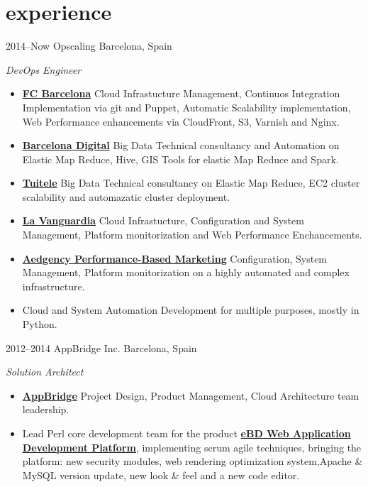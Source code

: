 \documentclass[]{friggeri-cv} %
\begin{document}
\section{experience}
\begin{entrylist}

\entry
{2014--Now}
{Opscaling}
{Barcelona, Spain}
{\emph{DevOps Engineer} \\
\begin{itemize}
\item \href{http://www.fcbarcelona.com/}{\textbf{FC Barcelona}} Cloud Infrastucture Management, Continuos Integration Implementation via git and Puppet, Automatic Scalability implementation, Web Performance enhancements via CloudFront, S3, Varnish and Nginx.
\item \href{http://www.bdigital.org/}{\textbf{Barcelona Digital}} Big Data Technical consultancy and Automation on Elastic Map Reduce, Hive, GIS Tools for elastic Map Reduce and Spark.
\item \href{http://www.tuitele.tv/}{\textbf{Tuitele}} Big Data Technical consultancy on Elastic Map Reduce, EC2 cluster scalability and automazatic cluster deployment.
\item \href{http://www.lavanguardia.com/}{\textbf{La Vanguardia}} Cloud Infrastucture, Configuration and System Management, Platform monitorization and Web Performance Enchancements.
\item \href{http://www.aedgency.com/}{\textbf{Aedgency Performance-Based Marketing}} Configuration, System Management, Platform monitorization on a highly automated and complex infrastructure.
\item Cloud and System Automation Development for multiple purposes, mostly in Python.   
\end{itemize}}
\pagebreak
\entry
{2012--2014}
{AppBridge Inc.}
{Barcelona, Spain}
{\emph{Solution Architect} \\
\begin{itemize}
\item \href{http://www.appbridge.com}{\textbf{AppBridge}} Project Design, Product Management, Cloud Architecture team leadership.
\item Lead Perl core development team for the product \href{http://www.ebdsoft.com}{\textbf{eBD Web Application Development Platform}}, implementing scrum agile techniques, bringing the platform: new security modules, web rendering optimization system,Apache \& MySQL version update, new look \& feel and a new code editor.

\end{itemize}}
\end{entrylist}
\end{document}
